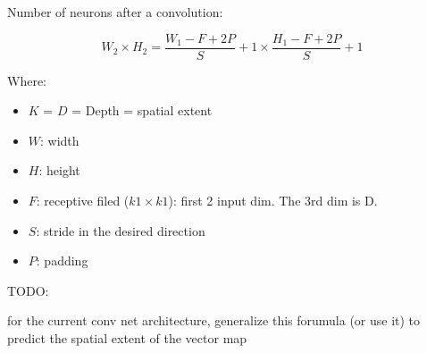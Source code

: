 \documentclass[a4paper,10pt]{article}
\title{}
\author{}
\date{}
\begin{document}
\maketitle
\clearpage
Number of neurons after a convolution:

$$ W_2 \times H_2 = \frac{W_1 - F + 2P}{S} + 1 \times  \frac{H_1 - F + 2P}{S} + 1 $$

Where:
\begin{itemize}
        \item $K$ = $D$ = Depth = spatial extent
        \item $W$: width
        \item $H$: height
        \item $F$: receptive filed ($k1 \times k1$): first 2 input dim. The 3rd dim is D.
        \item $S$: stride in the desired direction
        \item $P$: padding
\end{itemize}

TODO:

for the current conv net architecture, generalize this forumula (or use it)
to predict the spatial extent of the vector map
\end{document}
